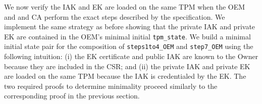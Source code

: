 \documentclass[runningheads]{llncs}
\begin{document}


We now verify the IAK and EK are loaded on the same TPM when the OEM and 
and CA perform the exact steps described 
by the specification. We
implement the same strategy as before showing that the private IAK and
private EK are contained in the OEM's minimal initial
\verb|tpm_state|. We build a minimal initial state pair for the
composition of \verb|steps1to4_OEM| and \verb|step7_OEM| using the
following intuition: (i) the EK certificate and public IAK are known
to the Owner because they are included in the CSR; and (ii) the
private IAK and private EK are loaded on the same TPM because the IAK
is credentialed by the EK. The two required proofs to determine
minimality proceed similarly to the corresponding proof in the
previous section.
\end{document}
